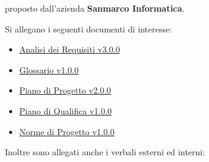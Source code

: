 \documentclass[10pt]{article}
\begin{document}
proposto dall’azienda \textbf{Sanmarco Informatica}.


Si allegano i seguenti documenti di interesse:
\begin{itemize}
  \item \href{https://github.com/7clickers/Documentazione-7clickers/blob/main/RTB/documentazione_esterna/analisi_dei_requisiti_v3.0.0.pdf}{Analisi dei Requisiti v3.0.0}
  \item \href{https://github.com/7clickers/Documentazione-7clickers/blob/main/RTB/documentazione_esterna/glossario_v1.0.0.pdf}{Glossario v1.0.0}
  \item \href{https://github.com/7clickers/Documentazione-7clickers/blob/main/RTB/documentazione_esterna/piano_di_progetto_v2.0.0.pdf}{Piano di Progetto v2.0.0}
  \item \href{https://github.com/7clickers/Documentazione-7clickers/blob/main/RTB/documentazione_esterna/piano_di_qualifica_v1.0.0.pdf}{Piano di Qualifica v1.0.0}
  \item \href{https://github.com/7clickers/Documentazione-7clickers/blob/main/RTB/documentazione_interna/norme_di_progetto_v1.0.0.pdf}{Norme di Progetto v1.0.0}
\end{itemize}

Inoltre sono allegati anche i verbali esterni ed interni:
\end{document}
